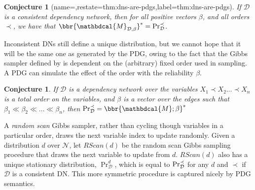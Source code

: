 \documentclass[letterpaper]{article} %
\theoremstyle{plain}
\newtheorem{lemma}[theorem]{Lemma}
\newtheorem{conj}[theorem]{Conjecture}
\theoremstyle{definition}
\theoremstyle{remark}
\newcommand{\begthm}[3][]{\begin{#2}[{name=#1},restate=#3,label=#3]}
\newcommand{\valpha}[1]{{\color{red!80!black}#1}}
\newcommand\mat[1]{\mathbf{#1}}
\newcommand{\dg}[1]{\mathbdcal{#1}}
\newcommand{\V}{\mathcal V}
\newcommand{\N}{\mathcal N}
\newcommand{\Ed}{\mathcal E}
\newcommand{\IDef}[1]{\mathit{IDef}_{\!#1}}
\newcommand{\PDGof}[1]{{\dg M}_{#1}}
\begin{document}


\begthm{conj}{thm:dns-are-pdgs}
If $\mathcal D$ is a consistent dependency network,
then for all positive vectors $\beta$, and all orders $\prec$, we have that
$\bbr{\PDGof{\mathcal D, \beta}}^* =  \Pr_{\cal D}^\prec$.
\end{conj}

Inconsistent DNs still define a unique distribution, but we cannot hope that it 
will be the same one as generated by the PDG, owing to the fact that
the Gibbs sampler defined by \citeauthor{heckerman2000dependency} is dependent
on the (arbitrary) fixed order used in sampling.
A PDG can simulate the effect of the order with the reliability $\beta$.

\begin{conj}
If $\mathcal D$ is a dependency network over the variables
$X_1 \prec X_2  \ldots  \prec X_n$ is a total order on the variables, and $\beta$ is a vector over the edges
such that  $\beta_1 \ll\beta_2 \ll \ldots \ll \beta_n$, 
then $\Pr_{\cal D}^{\prec} = \bbr{\dg M; \beta}^*$
\end{conj}

A \emph{random scan} Gibbs sampler, rather than cycling though variables in a 
particular order, draws the next variable index to update randomly.
Given a distribution $d$ over $\N$,
let $\mathit{RScan}(d)$ be the random scan Gibbs sampling procedure that draws
the next variable to update from $d$. $\mathit{RScan}(d)$ also has a unique stationary distribution, $\Pr_{\mathcal D}^d$, which is equal to $\Pr_{\cal D}^{\prec}$ for any $d$ and $\prec$ if $\mathcal D$ is a consistent DN. This more symmetric procedure is captured nicely by PDG semantics.
\end{document}
